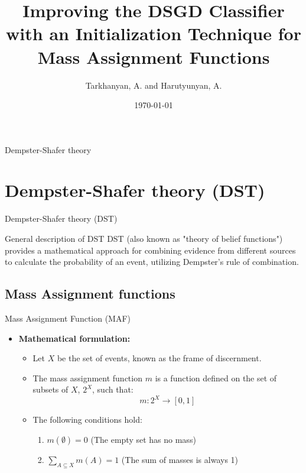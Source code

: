 \documentclass[aspectratio=169]{beamer}
\title{Improving the DSGD Classifier with an Initialization Technique for Mass Assignment Functions}
\author{Tarkhanyan, A. and Harutyunyan, A.}
\date{\today}
\begin{document}
\begin{frame}
  \titlepage
\end{frame}

\begin{frame}
{\small\tableofcontents}
\end{frame}

\begin{frame}
    \begin{center}
        \Huge Dempster-Shafer theory
    \end{center}
\end{frame}

\section{Dempster-Shafer theory (DST)}
\begin{frame}{Dempster-Shafer theory (DST)}
    \begin{block}{General description of DST}
        DST (also known as "theory of belief functions") provides a
mathematical approach for combining evidence from different sources to calculate
the probability of an event, utilizing Dempster’s rule of combination. 
        
    \end{block}
\end{frame}


\subsection{Mass Assignment functions}
\begin{frame}{Mass Assignment Function (MAF)}
  \begin{itemize}
    \item \textbf{Mathematical formulation:}
      \begin{itemize}
        \item Let \( X \) be the set of events, known as the frame of discernment. \pause
        \item The mass assignment function \( m \) is a function defined on the set of subsets of \( X \), \( 2^X \), such that:
          \[
          m : 2^X \rightarrow [0, 1]
          \]
        \pause
        \item The following conditions hold:
          \begin{enumerate}
            \item \( m(\emptyset) = 0 \) (The empty set has no mass)
            \item \( \sum\limits_{A \subseteq X} m(A) = 1 \) (The sum of masses is always 1)
          \end{enumerate}
      \end{itemize}
  \end{itemize}
\end{frame}
\end{document}
